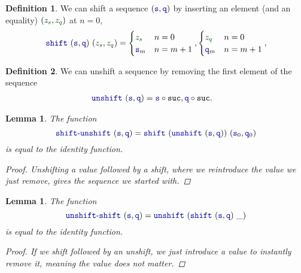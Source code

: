 \documentclass[twoside,11pt,openright]{report}
\theoremstyle{plain} %
\newtheorem{lem}[thm]{Lemma}
\theoremstyle{definition}
\newtheorem{defn}{Definition}[section]
\theoremstyle{remark}
\newcommand*{\term}[1]{\textcolor{green!30!black}{#1}} %
\newcommand*{\function}[1]{\textcolor{blue!60!black}{\ensuremath{\mathtt{#1}}}}
\begin{document}
\begin{defn}
  We can shift a sequence \((\function{s},\function{q})\) by inserting an element (and an equality) \((\term{z_s},\term{z_q})\) at \(n = 0\),
  \begin{equation}
    \function{shift}~(\function{s} , \function{q})~(\term{z_s} , \term{z_q}) = \begin{cases} \term{z_s} & n = 0 \\ \function{s}_m & n = m + 1 \end{cases} , \begin{cases} \term{z_q} & n = 0\\ \function{q}_m & n = m + 1 \end{cases},
  \end{equation}
\end{defn}
\begin{defn}
  We can unshift a sequence by removing the first element of the sequence
  \begin{equation}
    \begin{aligned}
      \function{unshift}&~(\function{s} , \function{q}) = \function{s} \circ \mathtt{suc} , \function{q} \circ \mathtt{suc}.
    \end{aligned}
  \end{equation}
\end{defn}
\begin{lem}
  The function
  \begin{equation}
    \function{shift\text{-}unshift}~(\function{s},\function{q}) = \function{shift}~(\function{unshift}~(\function{s},\function{q}))~(\function{s}_0,\function{q}_0)
  \end{equation}
  is equal to the identity function.
  \begin{proof}
    Unshifting a value followed by a shift, where we reintroduce the value we just remove, gives the sequence we started  with.
  \end{proof}
\end{lem}
\begin{lem}
  The function
  \begin{equation}
    \function{unshift\text{-}shift}~(\function{s},\function{q})=\function{unshift}~(\function{shift}~(\function{s},\function{q})~\_)
  \end{equation}
  is equal to the identity function.
  \begin{proof}
    If we shift followed by an unshift, we just introduce a value to instantly remove it, meaning the value does not matter.
  \end{proof}
\end{lem}
\end{document}
